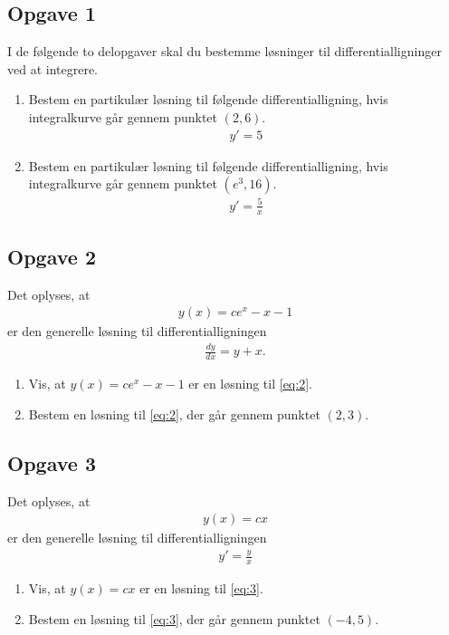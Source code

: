 \subsection*{Opgave 1}
I de følgende to delopgaver skal du bestemme løsninger til differentialligninger ved at integrere.
\begin{enumerate}[label=\roman*)]
	\item Bestem en partikulær løsning til følgende differentialligning, hvis integralkurve
	går gennem punktet $(2,6)$. 
	\begin{align*}
		y' = 5
	\end{align*}
	\item Bestem en partikulær løsning til følgende differentialligning, hvis integralkurve 
	går gennem punktet $(e^{3},16)$.
	\begin{align*}
		y' = \frac{5}{x} 
	\end{align*}
\end{enumerate}

\subsection*{Opgave 2}
	Det oplyses, at 
	\begin{align*}
		y(x) = ce^x-x-1
	\end{align*}
	er den generelle løsning til differentialligningen
	\begin{align}\label{eq:2}
		\frac{d y}{d x} = y+x.
	\end{align}
\begin{enumerate}[label=\roman*)]
\item Vis, at $y(x) = ce^x -x-1$ er en løsning til \eqref{eq:2}.
\item Bestem en løsning til \eqref{eq:2}, der går gennem punktet $(2,3)$.
\end{enumerate}


\subsection*{Opgave 3}
	Det oplyses, at 
	\begin{align*}
		y(x) = cx
	\end{align*}
	er den generelle løsning til differentialligningen
	\begin{align}\label{eq:3}
		y' = \frac{y}{x}
	\end{align}
\begin{enumerate}[label=\roman*)]
\item Vis, at $y(x) = cx$ er en løsning til \eqref{eq:3}.
\item Bestem en løsning til \eqref{eq:3}, der går gennem punktet $(-4,5)$.
\end{enumerate}


